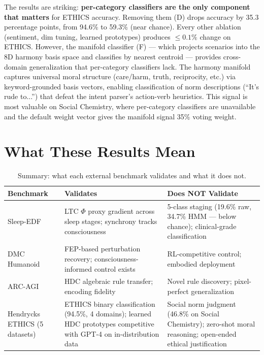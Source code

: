 \documentclass[12pt]{book}
\begin{document}
The results are striking: \textbf{per-category classifiers are the only component that matters} for ETHICS accuracy. Removing them (D) drops accuracy by 35.3 percentage points, from 94.6\% to 59.3\% (near chance). Every other ablation (sentiment, dim tuning, learned prototypes) produces $\leq 0.1\%$ change on ETHICS. However, the manifold classifier (F) --- which projects scenarios into the 8D harmony basis space and classifies by nearest centroid --- provides cross-domain generalization that per-category classifiers lack. The harmony manifold captures universal moral structure (care/harm, truth, reciprocity, etc.) via keyword-grounded basis vectors, enabling classification of norm descriptions (``It's rude to...'') that defeat the intent parser's action-verb heuristics. This signal is most valuable on Social Chemistry, where per-category classifiers are unavailable and the default weight vector gives the manifold signal 35\% voting weight.

\section{What These Results Mean}

\begin{table}[H]
\centering
\caption{Summary: what each external benchmark validates and what it does not.}
\label{tab:external-summary}
\begin{tabular}{p{2.5cm}p{4cm}p{5cm}}
\toprule
\textbf{Benchmark} & \textbf{Validates} & \textbf{Does NOT Validate} \\
\midrule
Sleep-EDF & LTC $\Phi$ proxy gradient across sleep stages; synchrony tracks consciousness & 5-class staging (19.6\% raw, 34.7\% HMM --- below chance); clinical-grade classification \\
DMC Humanoid & FEP-based perturbation recovery; consciousness-informed control exists & RL-competitive control; embodied deployment \\
ARC-AGI & HDC algebraic rule transfer; encoding fidelity & Novel rule discovery; pixel-perfect generalization \\
Hendrycks ETHICS (5 datasets) & ETHICS binary classification (94.5\%, 4 domains); learned HDC prototypes competitive with GPT-4 on in-distribution data & Social norm judgment (46.8\% on Social Chemistry); zero-shot moral reasoning; open-ended ethical justification \\
\bottomrule
\end{tabular}
\end{table}
\end{document}
